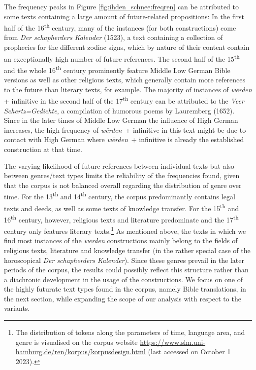 \documentclass[output=paper,colorlinks,citecolor=brown]{langscibook}
\begin{document}
The frequency peaks in Figure \ref{fig:ihden_schnee:freqren} can be attributed to some texts containing a large amount of future-related propositions: In the first half of the 16\textsuperscript{th} century, many of the instances (for both constructions) come from \textit{Der schapherders Kalender} (1523), a text containing a collection of prophecies for the different zodiac signs, which by nature of their content contain an exceptionally high number of future references. The second half of the 15\textsuperscript{th} and the whole 16\textsuperscript{th} century prominently feature Middle Low German Bible versions as well as other religious texts, which generally contain more references to the future than literary texts, for example. The majority of instances of \textit{wērden} + infinitive in the second half of the 17\textsuperscript{th} century can be attributed to the \textit{Veer Schertz=Gedichte}, a compilation of humorous poems by Lauremberg (1652). Since in the later times of Middle Low German the influence of High German increases, the high frequency of \textit{wērden}~+ infinitive in this text might be due to contact with High German where \textit{wērden}~+ infinitive is already the established construction at that time.

The varying likelihood of future references between individual texts but also between genres/text types limits the reliability of the frequencies found, given that the corpus is not balanced overall regarding the distribution of genre over time. For the 13\textsuperscript{th} and 14\textsuperscript{th} century, the corpus predominantly contains legal texts and deeds, as well as some texts of knowledge transfer. For the 15\textsuperscript{th} and 16\textsuperscript{th} century, however, religious texts and literature predominate and the 17\textsuperscript{th} century only features literary texts.\footnote{The distribution of tokens along the parameters of time, language area, and genre is visualised on the corpus website \href{https://www.slm.uni-hamburg.de/ren/korpus/korpusdesign.html}{https://www.slm.uni-hamburg.de/ren/korpus/korpusdesign.html} (last accessed on October 1 2023).} 
As mentioned above, the texts in which we find most instances of the \textit{wērden} constructions mainly belong to the fields of religious texts, literature and knowledge transfer (in the rather special case of the horoscopical \textit{Der schapherders Kalender}). Since these genres prevail in the later periods of the corpus, the results could possibly reflect this structure rather than a diachronic development in the usage of the constructions.  
We focus on one of the highly futurate text types found in the corpus, namely Bible translations, in the next section, while expanding the scope of our analysis with respect to the variants. 
\end{document}
